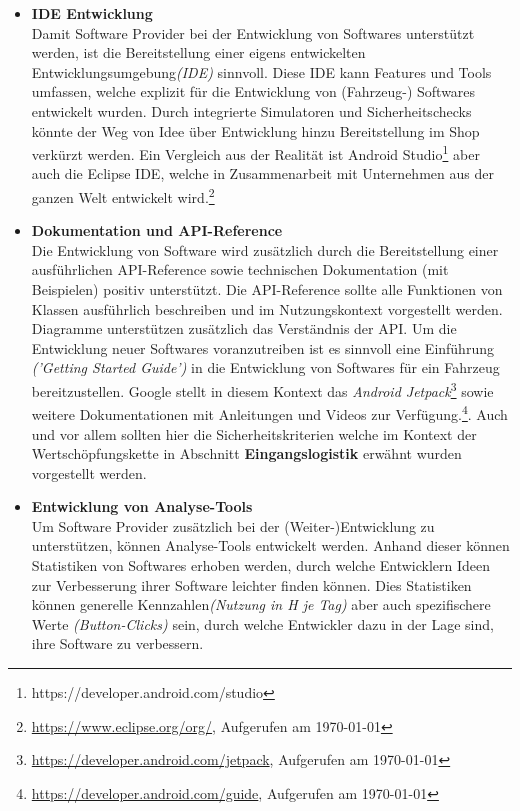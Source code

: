 \begin{itemize}
	\item[] \hspace{-0.6cm} \textbf{IDE Entwicklung}\\
	Damit Software Provider bei der Entwicklung von Softwares unterstützt werden, ist die Bereitstellung einer eigens entwickelten Entwicklungsumgebung\textit{(IDE)} sinnvoll. 
	Diese IDE kann Features und Tools umfassen, welche explizit für die Entwicklung von (Fahrzeug-) Softwares entwickelt wurden. Durch integrierte Simulatoren und Sicherheitschecks könnte der Weg von Idee über Entwicklung hinzu Bereitstellung im Shop verkürzt werden. Ein Vergleich aus der Realität ist Android Studio\footnote{https://developer.android.com/studio} aber auch die Eclipse IDE, welche in Zusammenarbeit mit Unternehmen aus der ganzen Welt entwickelt wird.\footnote{\url{https://www.eclipse.org/org/}, Aufgerufen am \today}
	
	\item[] \hspace{-0.6cm} \textbf{Dokumentation und API-Reference}\\
	Die Entwicklung von Software wird zusätzlich durch die Bereitstellung einer ausführlichen API-Reference sowie technischen Dokumentation (mit Beispielen) positiv unterstützt. Die API-Reference sollte alle Funktionen von Klassen ausführlich beschreiben und im Nutzungskontext vorgestellt werden. Diagramme unterstützen zusätzlich das Verständnis der API. Um die Entwicklung neuer Softwares voranzutreiben ist es sinnvoll eine Einführung \textit{('Getting Started Guide')} in die Entwicklung von Softwares für ein Fahrzeug bereitzustellen. Google stellt in diesem Kontext das \textit{Android Jetpack}\footnote{\url{https://developer.android.com/jetpack}, Aufgerufen am \today} sowie weitere Dokumentationen mit Anleitungen und Videos zur Verfügung.\footnote{\url{https://developer.android.com/guide}, Aufgerufen am \today}. Auch und vor allem sollten hier die Sicherheitskriterien welche im Kontext der Wertschöpfungskette in Abschnitt \textbf{Eingangslogistik} erwähnt wurden vorgestellt werden. 
	
	\item[] \hspace{-0.6cm} \textbf{Entwicklung von Analyse-Tools}\\
	Um Software Provider zusätzlich bei der (Weiter-)Entwicklung zu unterstützen, können Analyse-Tools entwickelt werden. Anhand dieser können Statistiken von Softwares erhoben werden, durch welche Entwicklern Ideen zur Verbesserung ihrer Software leichter finden können. Dies Statistiken können generelle Kennzahlen\textit{(Nutzung in H je Tag)} aber auch spezifischere Werte \textit{(Button-Clicks)} sein, durch welche Entwickler dazu in der Lage sind, ihre Software zu verbessern.
	

\end{itemize}
